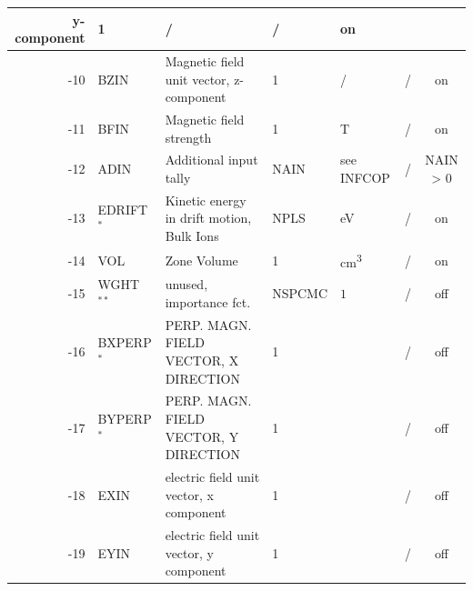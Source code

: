 \begin{landscape}
\begin{longtable}{|r|l|l|l|l|c|c|}
    y-component            & 1                            & /                                 & /              & on
    \\ \hline
    -10                    & BZIN                         & Magnetic field unit vector,
    z-component            & 1                            & /                                 & /              & on
    \\ \hline
    -11                    & BFIN                         & Magnetic field strength
			   & 1                            & \si{\tesla}                       & /              & on
    \\ \hline
    -12                    & ADIN                         & Additional input tally
			   & NAIN                         & see INFCOP                        & /              & NAIN > 0
    \\ \hline
    -13                    & EDRIFT$^*$                   & Kinetic energy in drift
    motion, Bulk Ions      & NPLS                         & \si{\electronvolt}                & /              & on
    \\ \hline
    -14                    & VOL                          & Zone Volume
			   & 1                            & \si{\cubic\centi\metre}           & /              & on
    \\ \hline
    -15                    & WGHT $^{**}
    $                      & unused, importance fct.
			   & NSPCMC                       & $ 1 $
			   & /              & off
    \\ \hline
    -16                    & BXPERP $^*$                  & PERP. MAGN. FIELD VECTOR, X DIRECTION
			   & 1                            &                                   & /              & off
    \\ \hline
    -17                    & BYPERP $^*$                  & PERP. MAGN. FIELD VECTOR, Y DIRECTION
			   & 1                            &                                   & /              & off
    \\ \hline
    -18                    & EXIN                         & electric field unit vector,
    x component            & 1                            &                                   & /              & off
    \\ \hline
    -19                    & EYIN                         & electric field unit vector,
    y component            & 1                            &                                   & /              & off
    \\ \hline

\end{longtable}
\end{landscape}
